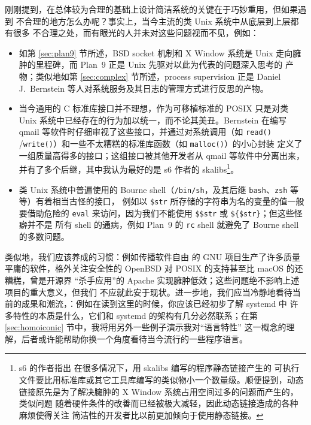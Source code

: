 刚刚提到，在总体较为合理的基础上设计简洁系统的关键在于巧妙重用，但如果遇到
不合理的地方怎么办呢？事实上，当今主流的类 Unix 系统中从底层到上层都有很多
不合理之处，而有眼光的人并未对这些问题视而不见，例如：
\begin{itemize}
\item 如第 \ref{sec:plan9} 节所述，BSD socket 机制和 X Window 系统是 Unix
	走向臃肿的里程碑，而 Plan~9 正是 Unix 先驱对以此为代表的问题深入思考的
	产物；类似地如第 \ref{sec:complex} 节所述，process supervision 正是
	Daniel J.\ Bernstein 等人对系统服务及其日志的管理方式进行反思的产物。
\item 当今通用的 C 标准库接口并不理想，作为可移植标准的
	POSIX 只是对类 Unix 系统中已经存在的行为加以统一，而不论其美丑。Bernstein
	在编写 qmail 等软件时仔细审视了这些接口，并通过对系统调用（如 \verb|read()|%
	/\verb|write()|）和一些不太糟糕的标准库函数（如 \verb|malloc()|）的小心封装
	定义了一组质量高得多的接口；这组接口被其他开发者从 qmail 等软件中分离出来，
	并有了多个后继，其中我认为最好的是 s6 作者的 skalibs\footnote{s6 的作者指出%
	在很多情况下，用 skalibs 编写的程序静态链接产生的
	可执行文件要比用标准库或其它工具库编写的类似物小一个数量级。顺便提到，动态
	链接原先是为了解决臃肿的 X Window 系统占用空间过多的问题而产生的，类似问题
	随着硬件条件的改善而已经被极大减轻，因此动态链接造成的各种麻烦使得关注
	简洁性的开发者比以前更加倾向于使用静态链接。}。
\item 类 Unix 系统中普遍使用的 Bourne shell（\verb|/bin/sh|，及其后继
	\verb|bash|、\verb|zsh| 等等）有着相当古怪的接口，
	例如以 \verb|$str| 所存储的字符串为名的变量的值一般要借助危险的 \verb|eval|
	来访问，因为我们不能使用 \verb|$$str| 或 \verb|${$str}|；但这些怪癖并不是
	所有 shell 的通病，例如 Plan~9 的 \verb|rc| shell 就避免了
	Bourne shell 的多数问题。
\end{itemize}
类似地，我们应该养成的习惯：例如传播软件自由
的 GNU 项目生产了许多质量平庸的软件，格外关注安全性的
OpenBSD 对 POSIX 的支持甚至比 macOS 的还糟糕，曾是开源界
“杀手应用”的 Apache 实现臃肿低效；这些问题绝不影响上述项目的重大意义，但我们
不应就此安于现状。进一步地，我们应当冷静地看待当前的成果和潮流，：例如在读到这里的时候，你应该已经初步了解 systemd 中
许多特性的本质是什么，它们和 systemd 的架构有几分必然联系；在第
\ref{sec:homoiconic} 节中，我将用另外一些例子演示我对“语言特性”
这一概念的理解，后者或许能帮助你换一个角度看待当今流行的一些程序语言。

